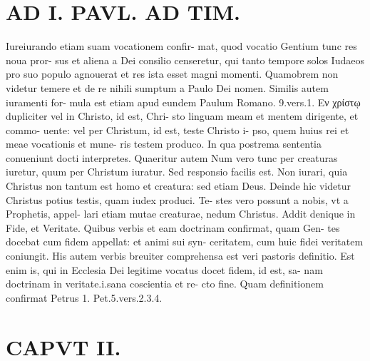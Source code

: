 \documentclass{article}
\begin{document}
\begin{pages}
\section*{AD I. PAVL. AD TIM. }
\marginpar{[ p.64 ]}\pstart Iureiurando etiam suam vocationem confir- mat, quod vocatio Gentium tunc res noua pror- sus et aliena a Dei consilio censeretur, qui tanto tempore solos Iudaeos pro suo populo agnouerat et res ista esset magni momenti. Quamobrem non videtur temere et de re nihili sumptum a Paulo Dei nomen. Similis autem iuramenti for- mula est etiam apud eundem Paulum Romano. 9.vers.1. Εν χρίστῳ dupliciter vel in Christo, id est, Chri- sto linguam meam et mentem dirigente, et commo- uente: vel per Christum, id est, teste Christo i- pso, quem huius rei et meae vocationis et mune- ris testem produco. In qua postrema sententia conueniunt docti interpretes. Quaeritur autem Num vero tunc per creaturas iuretur, quum per Christum iuratur. Sed responsio facilis est. Non iurari, quia Christus non tantum est homo et creatura: sed etiam Deus. Deinde hic videtur Christus potius testis, quam iudex produci. Te- stes vero possunt a nobis, vt a Prophetis, appel- lari etiam mutae creaturae, nedum Christus. Addit denique in Fide, et Veritate. Quibus verbis et eam doctrinam confirmat, quam Gen- tes docebat cum fidem appellat: et animi sui syn- ceritatem, cum huic fidei veritatem coniungit. His autem verbis breuiter comprehensa est veri pastoris definitio. Est enim is, qui in Ecclesia Dei legitime vocatus docet fidem, id est, sa- nam doctrinam in veritate.i.sana coscientia et re- cto fine. Quam definitionem confirmat Petrus 1. Pet.5.vers.2.3.4.  \pend
\section*{CAPVT  II. }
\marginpar{[ p.65 ]}\pstart {}
{}

\end{pages}
\end{document}

